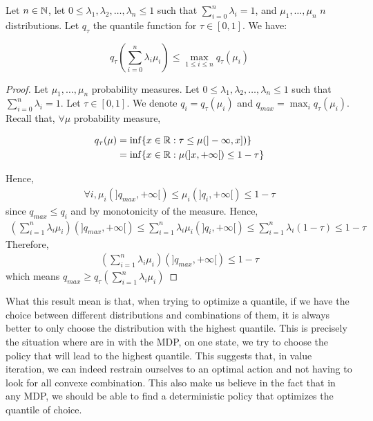 \begin{lemma}
    Let $n \in \mathbb{N}$, let $0 \leq \lambda_1,\lambda_2,\dots,\lambda_n \leq 1$ such that $\sum_{i = 0}^{n} \lambda_i = 1$, and $\mu_1,\dots, \mu_n $ $n$ distributions. Let $q_\tau$ the quantile function for $\tau \in [0,1]$. We have:

    \[ q_\tau \left( \sum_{i=0}^{n} \lambda_i \mu_i\right) \leq \max_{1 \leq i \leq n} q_\tau ( \mu_i) \]
\end{lemma}
\begin{proof}
    Let $\mu_1,\dots, \mu_n $ probability measures. Let $0 \leq \lambda_1,\lambda_2,\dots,\lambda_n \leq 1$ such that $\sum_{i = 0}^{n} \lambda_i = 1$. Let $\tau \in [0,1]$.
    We denote $q_i = q_\tau (\mu_i)$ and $q_{max} = \max_i q_\tau (\mu_i)$.\\

    Recall that, $\forall \mu$ probability measure, 
    
    \begin{align*}
        q_\tau (\mu) &= \inf \{ x \in \mathbb{R} : \tau \leq \mu ( ]-\infty, x])\}\\
                     &= \inf \{ x \in \mathbb{R} :  \mu (  ]x,+\infty[) \leq 1-\tau \}
    \end{align*}

    Hence,
    \begin{align*}
        \forall i, \mu_i \left(]q_{max}, +\infty[\right) \leq \mu_i\left(]q_i, +\infty[\right) \leq 1-\tau
    \end{align*}
    since $q_{max} \leq q_i$ and by monotonicity of the measure.
    Hence,      
    \begin{align*}
        \left( \sum_{i=1}^n \lambda_i \mu_i \right) \left(]q_{max}, +\infty[\right) \leq \sum_{i=1}^n \lambda_i \mu_i \left(]q_i, +\infty[\right) \leq \sum_{i=1}^n \lambda_i (1-\tau) \leq 1-\tau
    \end{align*}
    Therefore, 
    \begin{align*}
        \left( \sum_{i=1}^n \lambda_i \mu_i \right) \left(]q_{max}, +\infty[\right) \leq 1-\tau
    \end{align*}
     which means $q_{max} \geq q_\tau \left( \sum_{i=1}^n \lambda_i \mu_i \right)$
\end{proof}

What this result mean is that, when trying to optimize a quantile, if we have the choice between different distributions and combinations of them, it is always better to only choose the distribution with the highest quantile. This is precisely the situation where are in with the MDP, on one state, we try to choose the policy that will lead to the highest quantile. This suggests that, in value iteration, we can indeed restrain ourselves to an optimal action and not having to look for all convexe combination. This also make us believe in the fact that in any MDP, we should be able to find a deterministic policy that optimizes the quantile of choice.\\

